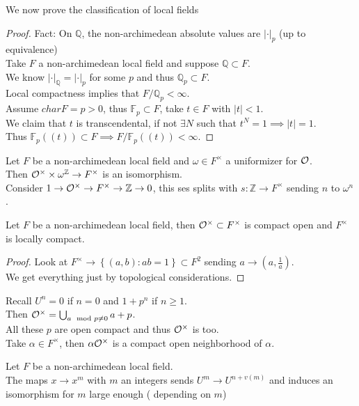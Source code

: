 \documentclass[../main.tex]{subfiles}
\begin{document}
We now prove the classification of local fields
\begin{proof}
Fact: On $ \mathbb{Q}$, the non-archimedean absolute values are $|\cdot|_p$ (up to equivalence)\\
Take $F$ a non-archimedean local field and suppose $ \mathbb{Q}\subset F$.\\
We know $|\cdot|_{\mathbb{Q}} = |\cdot|_p$ for some $p$ and thus $ \mathbb{Q}_p \subset F$.\\
Local compactness implies that $F / \mathbb{Q}_p < \infty $.\\
Assume $char F = p >0$, thus $ \mathbb{F}_p \subset F$, take $t\in F$ with $|t| <1$.\\
We claim that $t$ is transcendental, if not $\exists N $ such that $t^{N}=1\implies |t|=1$.\\
Thus $ \mathbb{F}_p ( ( t) ) \subset F \implies F / \mathbb{F}_p( ( t) )  < \infty $.
\end{proof}
\begin{thm}
	Let $F$ be a non-archimedean local field and $\omega\in F^{\times}$ a uniformizer for $ \mathcal{O}$.\\
	Then $\mathcal{O}^{\times}\times \omega^{ \mathbb{Z}} \to F^{\times}$ is an isomorphism.\\
	Consider $1 \to \mathcal{O}^{\times} \to F^{\times}\to \mathbb{Z}\to 0$, this ses splits with $s: \mathbb{Z}\to F^{\times}$ sending $n$ to $\omega^{n}$.
\end{thm}
\begin{thm}
	Let $F$ be a non-archimedean local field, then $\mathcal{O}^{\times} \subset F^{\times}$ is compact open and $F^{\times}$ is locally compact.
\end{thm}
\begin{proof}
Look at $F^{\times}\to \left\{ ( a,b) : ab =1 \right\} \subset F^{2}$ sending $a\to ( a, \frac{1}{a}) $.\\
We get everything just by topological considerations.
\end{proof}
Recall $U^{n}= 0$ if $n=0$ and $1+ p^{n}$ if $n \geq 1$.\\
Then $\mathcal{O}^{\times}= \bigcup_{a \mod p\neq 0} a+ p$.\\
All these $p$ are open compact and thus $\mathcal{O}^{\times}$ is too.\\
Take $\alpha\in F^{\times}$, then $\alpha \mathcal{O}^{\times}$ is a compact open neighborhood of $\alpha$.
\begin{lemma}
Let $F$ be a non-archimedean local field.\\
The maps $x\to x^{m}$ with $m$ an integers sends $U^{m}\to U^{n+ v( m) }$ and induces an isomorphism for $m$ large enough ( depending on $m$) 
\end{lemma}
\end{document}
